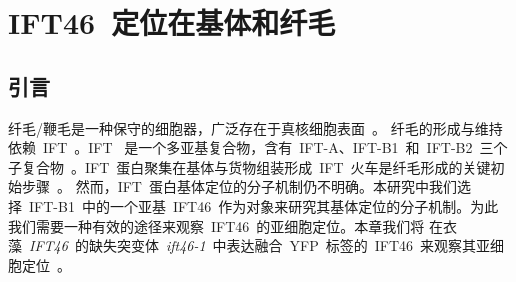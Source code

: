 \chapter{IFT46\ 定位在基体和纤毛}
\renewcommand{\leftmark}{第三章\quad IFT46\ 定位在基体和纤毛}
\section{引言}
纤毛/鞭毛是一种保守的细胞器，广泛存在于真核细胞表面\
\citep{Ishikawa2011,Hildebrandt2011,Scholey2003,Fliegauf2007}。 纤毛的形成与维持依赖\ IFT\ \citep{Bhogaraju2013,Dentler2005,Engel2012,Morga2013,Pedersen2008,Scholey2003,Taschner2016,Mourao2016}。IFT \ 是一个多亚基复合物，含有\ IFT-A、IFT-B1\ 和\ IFT-B2\ 三个子复合物\ \citep{Taschner2016a,Taschner2016,Katoh2016}。IFT\ 蛋白聚集在基体与货物组装形成\ IFT\ 火车是纤毛形成的关键初始步骤\
\citep{Morga2013,Bhogaraju2014,Brown2015,Ishikawa2011}。 然而，IFT\ 蛋白基体定位的分子机制仍不明确。本研究中我们选择\ IFT-B1\ 中的一个亚基\ IFT46\ 作为对象来研究其基体定位的分子机制。为此我们需要一种有效的途径来观察\ IFT46\ 的亚细胞定位。本章我们将
在衣藻\ \textit{IFT46}\ 的缺失突变体\ \index{突变体}\textit{ift46-1}\ 中表达融合\ YFP\index{YFP}\ 标签的\ IFT46\ 来观察其亚细胞定位\ \citep{Hou2007}。
